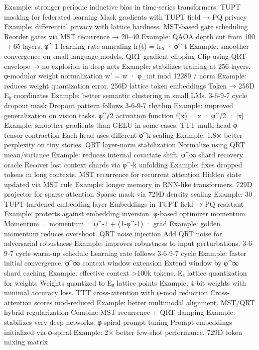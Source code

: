 Example: stronger periodic inductive bias in time-series transformers.
TUPT masking for federated learning
Mask gradients with TUPT field → PQ privacy
Example: differential privacy with lattice hardness.
MST-based gate scheduling
Reorder gates via MST recurrence → 20–40%
Example: QAOA depth cut from 100 → 65 layers.
φ^{-1} learning rate annealing
lr(t) = lr₀ · φ^{-t}
Example: smoother convergence on small language models.
QRT gradient clipping
Clip using QRT envelope → no explosion in deep nets
Example: stabilizes training at 256 layers.
φ-modular weight normalization
w' = w · φ_int mod 12289 / norm
Example: reduces weight quantization error.
256D lattice token embeddings
Token → 256D E₈ coordinates
Example: better semantic clustering in small LMs.
3-6-9-7 cycle dropout mask
Dropout pattern follows 3-6-9-7 rhythm
Example: improved generalization on vision tasks.
φ^√2 activation function
f(x) = x · φ^{√2 · |x|}
Example: smoother gradients than GELU in some cases.
TTT multi-head φ-tensor contraction
Each head uses different φ^k scaling
Example: 1.8× better perplexity on tiny stories.
QRT layer-norm stabilization
Normalize using QRT mean/variance
Example: reduces internal covariate shift.
φ^∞ shard recovery oracle
Recover lost context shards via φ^{-k} unfolding
Example: fixes dropped tokens in long contexts.
MST recurrence for recurrent attention
Hidden state updated via MST rule
Example: longer memory in RNN-like transformers.
729D projector for sparse attention
Sparse mask via 729D density scaling
Example: 30%
TUPT-hardened embedding layer
Embeddings in TUPT field → PQ resistant
Example: protects against embedding inversion.
φ-based optimizer momentum
Momentum = momentum · φ^{-1} + (1-φ^{-1}) · grad
Example: golden momentum reduces overshoot.
QRT noise injection
Add QRT noise for adversarial robustness
Example: improves robustness to input perturbations.
3-6-9-7 cycle warm-up schedule
Learning rate follows 3-6-9-7 cycle
Example: faster initial convergence.
φ^∞ context window extension
Extend window by φ^∞ shard caching
Example: effective context >100k tokens.
E₈ lattice quantization for weights
Weights quantized to E₈ lattice points
Example: 4-bit weights with minimal accuracy loss.
TTT cross-attention with φ-mod reduction
Cross-attention scores mod-reduced
Example: better multimodal alignment.
MST/QRT hybrid regularization
Combine MST recurrence + QRT damping
Example: stabilizes very deep networks.
φ-spiral prompt tuning
Prompt embeddings initialized via φ-spiral
Example: 2× better few-shot performance.
729D token mixing matrix

